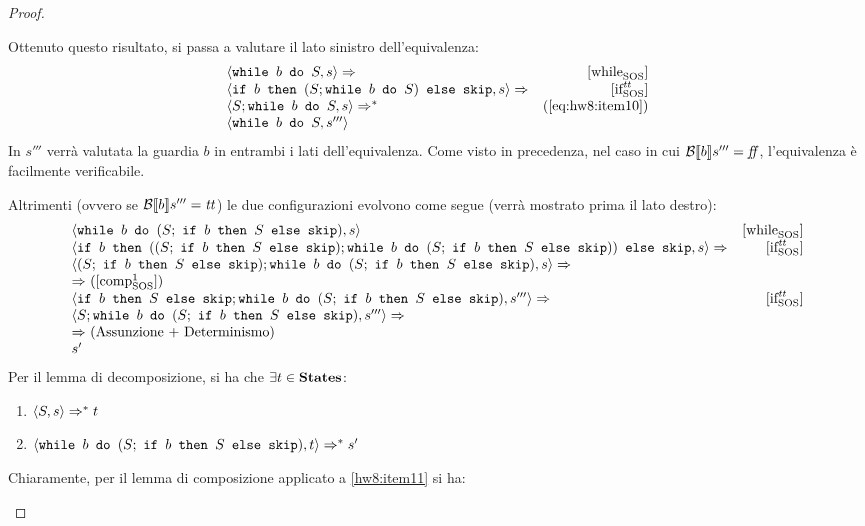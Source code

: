 \begin{proof}
\begin{itemize}
\begin{equation}
  \end{equation}
  Ottenuto questo risultato, si passa a valutare il lato sinistro
  dell'equivalenza:
  $$
  \begin{array}{lr}
  \confSs{\wbS{b}{S}}{s} \Rar{ }  & \whileSOS \\
  \confSs{\ifABC{b}{(S;\wbS{b}{S})}{\skipForFriends}}{s} \Rar{ } & \ifttSOS\\
  \confSs{S; \wbS{b}{S}}{s} \Rar{*} & (\text{\ref{eq:hw8:item10}})\\
  \confSs{\wbS{b}{S}}{s'''}
  \end{array}
  $$
  In $s'''$ verrà valutata la guardia $b$ in entrambi i lati dell'equivalenza.
  Come visto in precedenza, nel caso in cui $\B{b}''' = \semfalse$,
  l'equivalenza è facilmente verificabile.

  Altrimenti (ovvero se $\B{b}''' = \semtrue$) le due configurazioni evolvono
  come segue (verrà mostrato prima il lato destro):
  $$
  \begin{array}{lr}
  \confSs{\wbS{b}{(S;\ \ifABC{b}{S}{\skipForFriends})}}{s} & \whileSOS \\
  \confSs{\ifABC{b}
            {((S;\ \ifABC{b}{S}{\skipForFriends});
              \wbS{b}{(S;\ \ifABC{b}{S}{\skipForFriends})})}
            {\skipForFriends}
         }{s} \Rar{ }& \ifttSOS \\
  \confSs{  (S;\ \ifABC{b}{S}{\skipForFriends});
            \wbS{b}{(S;\ \ifABC{b}{S}{\skipForFriends})}
         }{s} \Rar{ } \\
  \Rar{ } (\text{$\compoSOS$})\\
  \confSs{  \ifABC{b}{S}{\skipForFriends};
            \wbS{b}{(S;\ \ifABC{b}{S}{\skipForFriends})}
         }{s'''} \Rar{ } & \ifttSOS \\
  \confSs{  S;
            \wbS{b}{(S;\ \ifABC{b}{S}{\skipForFriends})}
         }{s'''} \Rar{ } \\
  \Rar{ } (\text{Assunzione + Determinismo})\\
  s'
  \end{array}
  $$
  Per il lemma di decomposizione, si ha che $\exists{t}\in\states$:
  \begin{enumerate}[label=(\alph*)]
    \item $\confSs{S}{s} \Rar{*} t$
    \label{hw8:item11}
    \item $\confSs{\wbS{b}{(S;\ \ifABC{b}{S}{\skipForFriends})}}{t} \Rar{*} s'$
    \label{hw8:item12}
  \end{enumerate}
  Chiaramente, per il lemma di composizione applicato a \ref{hw8:item11} si ha:

\end{itemize}
\end{proof}
